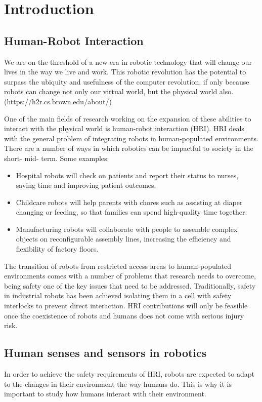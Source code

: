 \chapter{Introduction}
\label{introchap}

\section{Human-Robot Interaction}
We are on the threshold of a new era in robotic technology that will change our lives in the way we live and work. This robotic revolution has the potential to surpass the ubiquity and usefulness of the computer revolution, if only because robots can change not only our virtual world, but the physical world also. (https://h2r.cs.brown.edu/about/)

One of the main fields of research working on the expansion of these abilities to interact with the physical world is human-robot interaction (HRI). HRI deals with the general problem of integrating robots in human-populated environments. There are a number of ways in which robotics can be impactful to society in the short- mid- term. Some examples:

\begin{itemize}
    \item Hospital robots will check on patients and report their status to nurses, saving time and improving patient outcomes.
    \item Childcare robots will help parents with chores such as assisting at diaper changing or feeding, so that families can spend high-quality time together.
    \item Manufacturing robots will collaborate with people to assemble complex objects on reconfigurable assembly lines, increasing the efficiency and flexibility of factory floors.
\end{itemize}


The transition of robots from restricted access areas to human-populated environments comes with a number of problems that research needs to overcome, being safety one of the key issues that need to be addressed. Traditionally, safety in industrial robots has been achieved isolating them in a cell with safety interlocks to prevent direct interaction. HRI contributions will only be feasible once the coexistence of robots and humans does not come with serious injury risk.

\section{Human senses and sensors in robotics}
In order to achieve the safety requirements of HRI, robots are expected to adapt to the changes in their environment the way humans do. This is why it is important to study how humans interact with their environment.

